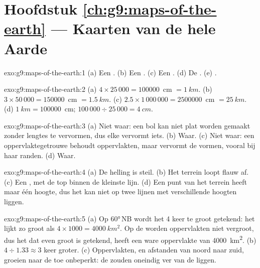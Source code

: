 \section*{Hoofdstuk \ref{ch:g9:maps-of-the-earth} --- Kaarten van de hele Aarde}

\begin{solution}{exo:g9:maps-of-the-earth:1}
(a) Een . (b) Een . (c) Een . (d) De
. (e) .
\end{solution}

\begin{solution}{exo:g9:maps-of-the-earth:2}
(a) $4 \times 25\,000 = \num{100000}$~cm $= \qty{1}{km}$. (b) $3 \times
50\,000 = \num{150000}$~cm $= \qty{1.5}{km}$. (c) $2.5 \times 1\,000\,000
= \num{2500000}$~cm $= \qty{25}{km}$. (d) $\qty{1}{km} = \num{100000}$~cm;
$100\,000 \div 25\,000 = \qty{4}{cm}$.
\end{solution}

\begin{solution}{exo:g9:maps-of-the-earth:3}
(a) Niet waar: een bol kan niet plat worden gemaakt zonder lengtes te
vervormen, dus elke  vervormt iets. (b) Waar. (c) Niet waar: een
oppervlaktegetrouwe  behoudt oppervlakten, maar vervormt de vormen,
vooral bij haar randen. (d) Waar.
\end{solution}

\begin{solution}{exo:g9:maps-of-the-earth:4}
(a) De helling is steil. (b) Het terrein loopt flauw af. (c) Een ,
met de top binnen de kleinste lijn. (d) Een punt van het terrein heeft maar
één hoogte, dus het kan niet op twee lijnen met verschillende hoogten
liggen.
\end{solution}

\begin{solution}{exo:g9:maps-of-the-earth:5}
(a) Op \ang{60}\,NB wordt het  4 keer te groot getekend: het lijkt zo
groot als $4 \times 1000 = \qty{4000}{km^2}$. Op de  worden
oppervlakten niet vergroot, dus het  dat even groot is getekend, heeft
een ware oppervlakte van \qty{4000}{km^2}. (b) $4 \div 1.33 \approx 3$ keer
groter. (c) Oppervlakten, en afstanden van noord naar zuid, groeien naar de
 toe onbeperkt: de  zouden oneindig ver van de  liggen.
\end{solution}

